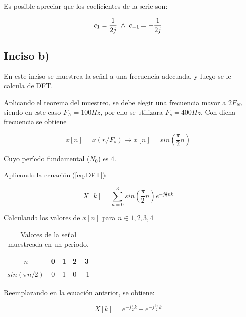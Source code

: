 \documentclass{article}
\begin{document}
    Es posible apreciar que los coeficientes de la serie son: 

    \begin{equation}
        c_1 = \frac{1}{2j} \hspace*{.1cm} \land \hspace*{.1cm} c_{-1}=-\frac{1}{2j}
    \end{equation}

    \subsection*{Inciso b)}

    En este inciso se muestrea la señal a una frecuencia adecuada, y luego se le calcula de DFT.

    Aplicando el teorema del muestreo, se debe elegir una frecuencia mayor a $2F_N$, siendo 
    en este caso $F_N=100Hz$, por ello se utilizara $F_s=400Hz$. Con dicha frecuencia se obtiene 

    \begin{equation}
        x[n]=x(n/F_s) \rightarrow x[n]= sin\left( \frac{\pi}{2} n\right)
    \end{equation}

    Cuyo período fundamental ($N_0$) es $4$.

    Aplicando la ecuación (\ref{eq.DFT}):

    \begin{equation}
        X[k]= \sum_{n=0}^{3} sin\left( \frac{\pi}{2} n\right) e^{-j\frac{\pi}{2} nk}
    \end{equation}

    Calculando los valores de $x[n]$ para $n\in {1, 2, 3 ,4}$

    \begin{table}[H]
        \centering
            \begin{tabular}{|c|c|c|c|c|}
            \hline
            $n$ & 0 & 1 & 2 & 3  \\ \hline
            $sin(\pi n/2)$ & 0 & 1 & 0 & -1 \\ \hline
            \end{tabular}
        \caption{Valores de la señal muestreada en un periodo.}
    \end{table}

    Reemplazando en la ecuación anterior, se obtiene:

    \begin{equation}
        X[k]= e^{-j\frac{\pi}{2}k} - e^{-j\frac{ 3 \pi}{2}k}
    \end{equation}
\end{document}
